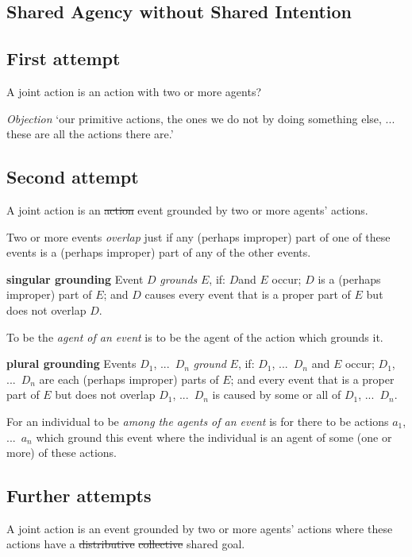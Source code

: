 \documentclass[11pt]{extarticle}
\begin{document}
\begin{multicols}{3}
\section{Shared Agency without Shared Intention}



\subsection{First attempt}
A joint action is an action with two or more agents?\citep{ludwig_collective_2007}

\emph{Objection} 
`our primitive actions, the ones we do not by doing something else, ... these are all the actions there are.'\citep%
{Davidson:1971fz}


\subsection{Second attempt}
A joint action is an \sout{action} event grounded by two or more agents’ actions.

Two or more events \emph{overlap} just if any (perhaps improper) part of one of these events is a (perhaps improper) part of any of the other events.

\textbf{singular grounding} 
Event $D$ \emph{grounds} $E$, if: $D$and $E$ occur; 
$D$ is a (perhaps improper) part of $E$; and 
$D$ causes every event that is a proper part of $E$ but does not overlap $D$.

To be the \emph{agent of an event} is to be the agent of the action which grounds it.\citep%
{pietroski_actions_1998}


\textbf{plural grounding} 
Events $D_1$, ...\ $D_n$ \emph{ground} $E$, if: $D_1$, ...\ $D_n$ and $E$ occur; 
$D_1$, ...\ $D_n$ are each (perhaps improper) parts of $E$; and 
every event that is a proper part of $E$ but does not overlap  $D_1$, ...\ $D_n$ is caused by some or all of $D_1$, ...\ $D_n$.

For an individual to be \emph{among the agents of an event} is for there to be actions $a_1$, ...\ $a_n$ which ground this event where the individual is an agent of some (one or more) of these actions.



\subsection{Further attempts}

A joint action is an event grounded by two or more agents’ actions where these actions have a \sout{distributive} \sout{collective} shared goal.


\end{multicols}
\end{document}
